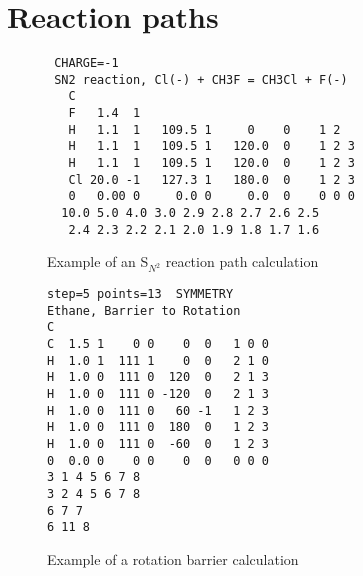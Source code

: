 \section{Reaction paths}
\label{rpaths}

\begin{figure}
\begin{makeimage}
\end{makeimage}
\begin{verbatim}
 CHARGE=-1
 SN2 reaction, Cl(-) + CH3F = CH3Cl + F(-)
   C
   F   1.4  1
   H   1.1  1   109.5 1     0    0    1 2
   H   1.1  1   109.5 1   120.0  0    1 2 3
   H   1.1  1   109.5 1   120.0  0    1 2 3
   Cl 20.0 -1   127.3 1   180.0  0    1 2 3
   0   0.00 0     0.0 0     0.0  0    0 0 0
  10.0 5.0 4.0 3.0 2.9 2.8 2.7 2.6 2.5
   2.4 2.3 2.2 2.1 2.0 1.9 1.8 1.7 1.6
\end{verbatim}
\caption{\label{sn2} Example of an S$_{N^2}$ reaction path calculation}
\end{figure}

\begin{figure}
\begin{makeimage}
\end{makeimage}
\begin{verbatim}
step=5 points=13  SYMMETRY
Ethane, Barrier to Rotation
C
C  1.5 1    0 0    0  0   1 0 0
H  1.0 1  111 1    0  0   2 1 0
H  1.0 0  111 0  120  0   2 1 3
H  1.0 0  111 0 -120  0   2 1 3
H  1.0 0  111 0   60 -1   1 2 3
H  1.0 0  111 0  180  0   1 2 3
H  1.0 0  111 0  -60  0   1 2 3
0  0.0 0    0 0    0  0   0 0 0
3 1 4 5 6 7 8
3 2 4 5 6 7 8
6 7 7
6 11 8
\end{verbatim}
\caption{\label{c2h6p} Example of a rotation barrier calculation}
\end{figure}

